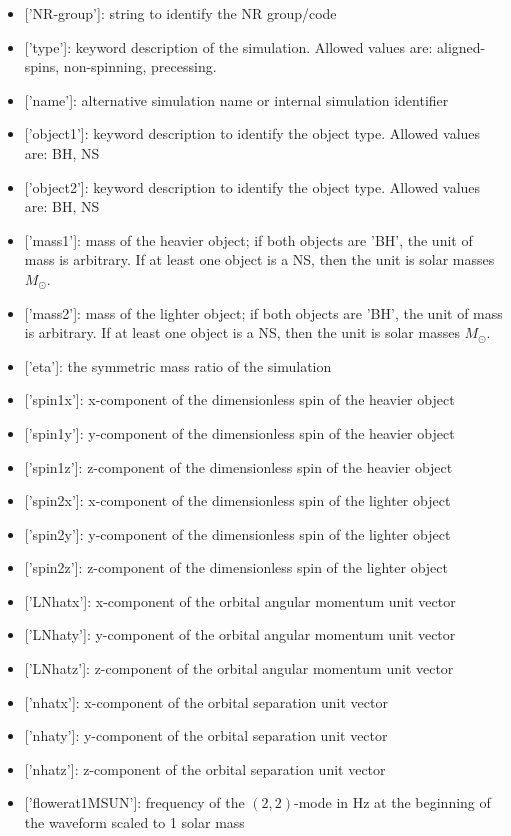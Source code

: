 \documentclass[aps,prd,amssymb,amsmath,amsfonts,superscriptaddress,
floatfix ,preprintnumbers,altaffilletter]{revtex4}
\begin{document}
\begin{itemize}
\item {[}'NR-group'{]}: string to identify the NR group/code
\item {[}'type'{]}: keyword description of the simulation. Allowed values are: aligned-spins, non-spinning, precessing.
\item{[}'name'{]}: alternative simulation name or internal simulation identifier
\item{[}'object1'{]}: keyword description to identify the object type. Allowed values are: BH, NS
\item {[}'object2'{]}: keyword description to identify the object type. Allowed values are: BH, NS
\item{[}'mass1'{]}: mass of the heavier object; if both objects are 'BH', the unit of mass is arbitrary. If at least one object is a NS, then the unit is solar masses $M_\odot$.
\item{[}'mass2'{]}: mass of the lighter object; if both objects are 'BH', the unit of mass is arbitrary. If at least one object is a NS, then the unit is solar masses $M_\odot$.
\item{[}'eta'{]}: the symmetric mass ratio of the simulation
\item{[}'spin1x'{]}: x-component of the dimensionless spin of the heavier object
\item{[}'spin1y'{]}: y-component of the dimensionless spin of the heavier object 
\item{[}'spin1z'{]}: z-component of the dimensionless spin of the heavier object
\item{[}'spin2x'{]}: x-component of the dimensionless spin of the lighter object
\item{[}'spin2y'{]}: y-component of the dimensionless spin of the lighter object 
\item{[}'spin2z'{]}: z-component of the dimensionless spin of the lighter object
\item{[}'LNhatx'{]}: x-component of the orbital angular momentum unit vector
\item{[}'LNhaty'{]}: y-component of the orbital angular momentum unit vector
\item{[}'LNhatz'{]}: z-component of the orbital angular momentum unit vector
\item{[}'nhatx'{]}: x-component of the orbital separation unit vector
\item{[}'nhaty'{]}: y-component of the orbital separation unit vector
\item{[}'nhatz'{]}: z-component of the orbital separation unit vector
\item{[}'f\textunderscore lower\textunderscore at\textunderscore 1MSUN'{]}: frequency of the $(2,2)$-mode in Hz at the beginning of the waveform scaled to 1 solar mass
\end{itemize}
\end{document}
